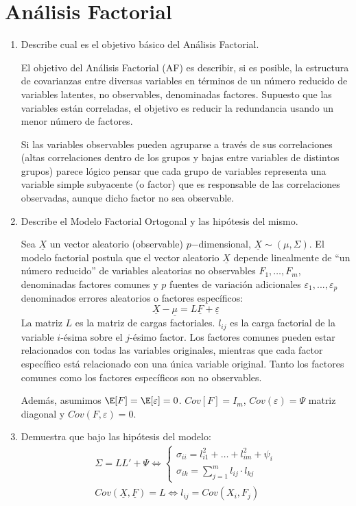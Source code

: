 \documentclass[twoside]{article}
\newcommand{\muestra}[1]{{\underline{#1}}}
\newcommand{\m}[1]{{\muestra{#1}}}
\newcommand{\mX}{{\muestra{X}}}
\begin{document}
\section{Análisis Factorial}
\begin{enumerate}
\item Describe cual es el objetivo básico del Análisis Factorial.

El objetivo del Análisis Factorial (AF) es describir, si es posible, la estructura de covarianzas entre diversas variables en términos de un número reducido de variables latentes, no observables, denominadas factores. Supuesto que las variables están correladas, el objetivo es reducir la redundancia usando un menor número de factores. 

Si las variables observables pueden agruparse a través de sus correlaciones (altas correlaciones dentro de los grupos y
bajas entre variables de distintos grupos) parece lógico pensar que cada grupo de variables representa una variable simple subyacente (o factor) que es responsable de
las correlaciones observadas, aunque dicho factor no sea observable.

\item Describe el Modelo Factorial Ortogonal y las hipótesis del mismo.

Sea $\muestra{X}$ un vector aleatorio (observable) $p$−dimensional, $\mX \sim (\mu,\Sigma)$. El modelo factorial postula que el vector aleatorio $\muestra{X}$ depende linealmente de \enquote{un número reducido} de variables aleatorias no observables $F_1,\dotsc,F_m$, denominadas factores comunes y $p$ fuentes de variación adicionales $\varepsilon_1, ..., ε_p$ denominados errores aleatorios o
factores específicos:
$$
\mX-\m{\mu} = L\m{F}+\m{\varepsilon}
$$
La matriz $L$ es la matriz de cargas factoriales. $l_{ij}$ es la carga factorial de la variable $i$-ésima sobre el $j$-ésimo factor. Los factores comunes pueden estar relacionados con todas las variables originales, mientras que cada factor específico está relacionado con una única variable original. Tanto los factores comunes como los factores específicos son no observables. 

Además, asumimos $\E[F]=\E[\varepsilon]=0$. $Cov[F]=I_m$, $Cov(\varepsilon)=\Psi$ matriz diagonal y $Cov(F,\varepsilon)=0$.
\item Demuestra que bajo las hipótesis del modelo:
\begin{gather}
\Sigma = L L' + \Psi \Leftrightarrow
\begin{cases}
\sigma_{ii} = l_{i1}^2 + \dots + l_{im}^2 + \psi_i\\
\sigma_{ik} = \sum_{j=1}^m l_{ij} \cdot l_{kj}
\end{cases}\\
Cov(\m{X}, \m{F}) = L \Leftrightarrow l_{ij} = Cov(X_i, F_j)
\end{gather}


\end{enumerate}
\end{document}
